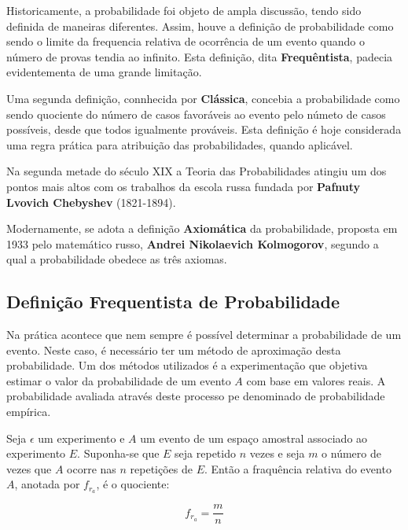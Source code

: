 \inic Historicamente, a probabilidade foi objeto de ampla discussão, tendo sido definida de maneiras diferentes. Assim, houve a definição de probabilidade como sendo o limite da frequencia relativa de ocorrência de um evento quando o número de provas tendia ao infinito. Esta definição, dita \textbf{Frequêntista}, padecia evidentementa de uma grande limitação.\vskip0.3cm
 
\inic Uma segunda definição, connhecida por \textbf{Clássica}, concebia a probabilidade como sendo quociente do número de casos favoráveis ao evento pelo númeto de casos possíveis, desde que todos igualmente prováveis. Esta definição é hoje considerada uma regra prática para atribuição das probabilidades, quando aplicável.\vskip0.3cm

\inic Na segunda metade do século XIX a Teoria das Probabilidades atingiu um dos pontos mais altos com os trabalhos da escola russa fundada por \textbf{Pafnuty Lvovich Chebyshev} (1821-1894).\vskip0.3cm
 
\inic Modernamente, se adota a definição \textbf{Axiomática} da probabilidade, proposta em 1933 pelo matemático russo, \textbf{Andrei Nikolaevich Kolmogorov}, segundo a qual a probabilidade obedece as três axiomas.
 




 
\subsection{Definição Frequentista de Probabilidade}

\inic Na prática acontece que nem sempre é possível determinar a probabilidade de um evento. Neste caso, é necessário ter um método de aproximação desta probabilidade. Um dos métodos utilizados é a experimentação que objetiva estimar o valor da probabilidade de um evento $A$ com base em valores reais. A probabilidade avaliada através deste processo pe denominado de probabilidade empírica.\vskip0.3cm

\inic Seja $\epsilon$ um experimento e $A$ um evento de um espaço amostral associado ao experimento $E$. Suponha-se que $E$ seja repetido $n$ vezes e seja $m$ o número de vezes que $A$ ocorre nas $n$ repetições de $E$. Então a fraquência relativa do evento $A$, anotada por $f_{r_{a}}$, é o quociente:
 
\begin{equation}
     f_{r_{a}}= \frac{m}{n}
\end{equation}
 
